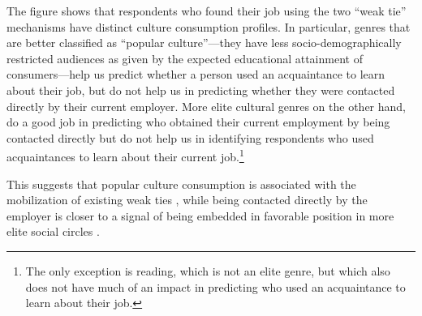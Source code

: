 \documentclass[12pt]{article}
\begin{document}
The figure shows that respondents who found their job using the two ``weak tie'' mechanisms have distinct culture consumption profiles.  In particular, genres that are better classified as ``popular culture''---they have less socio-demographically restricted audiences as given by the expected educational attainment of consumers---help us predict whether a person used an acquaintance to learn about their job, but do not help us in predicting whether they were contacted directly by their current employer.  More elite cultural genres on the other hand, do a good job in predicting who  obtained their current employment by being contacted directly but do not help us in identifying respondents who used acquaintances to learn about their current job.\footnote{The only exception is reading, which is not an elite genre, but which also does not have much of an impact in predicting who used an acquaintance to learn about their job.}  

This suggests that popular culture consumption is associated with the mobilization of existing weak ties \citep{lizardo06a}, while being contacted directly by the employer is closer to a signal of being embedded in favorable position in more elite social circles \citep{kadushin66}.




\singlespacing
\newpage


\end{document}
